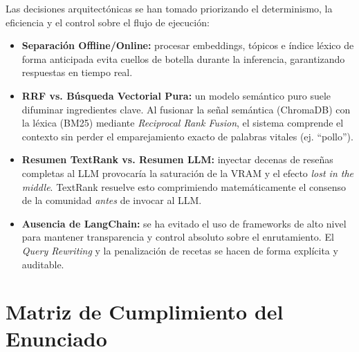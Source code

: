 \documentclass[11pt,a4paper]{article}
\begin{document}
Las decisiones arquitectónicas se han tomado priorizando el determinismo, la eficiencia y el control sobre el flujo de ejecución:
\begin{itemize}
    \item \textbf{Separación Offline/Online:} procesar embeddings, tópicos e índice léxico de forma anticipada evita cuellos de botella durante la inferencia, garantizando respuestas en tiempo real.
    \item \textbf{RRF vs. Búsqueda Vectorial Pura:} un modelo semántico puro suele difuminar ingredientes clave. Al fusionar la señal semántica (ChromaDB) con la léxica (BM25) mediante \textit{Reciprocal Rank Fusion}, el sistema comprende el contexto sin perder el emparejamiento exacto de palabras vitales (ej. ``pollo'').
    \item \textbf{Resumen TextRank vs. Resumen LLM:} inyectar decenas de reseñas completas al LLM provocaría la saturación de la VRAM y el efecto \textit{lost in the middle}. TextRank resuelve esto comprimiendo matemáticamente el consenso de la comunidad \textit{antes} de invocar al LLM.
    \item \textbf{Ausencia de LangChain:} se ha evitado el uso de frameworks de alto nivel para mantener transparencia y control absoluto sobre el enrutamiento. El \textit{Query Rewriting} y la penalización de recetas se hacen de forma explícita y auditable.
\end{itemize}

\section{Matriz de Cumplimiento del Enunciado}
\end{document}
